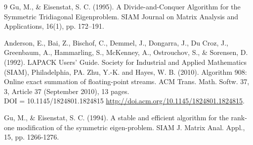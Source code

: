 \documentclass[11pt,a4paper]{article}
\begin{document}
\begin{thebibliography}{9}
    Gu, M., \& Eisenstat, S. C. (1995). \rm{A Divide-and-Conquer Algorithm for the Symmetric Tridiagonal Eigenproblem}. SIAM Journal on Matrix Analysis and Applications, 16(1), pp. 172--191.

    Anderson, E., Bai, Z., Bischof, C., Demmel, J., Dongarra, J., Du Croz, J., Greenbaum, A., Hammarling, S., McKenney, A., Ostrouchov, S., \& Sorensen, D. (1992). \rm{LAPACK Users' Guide}. Society for Industrial and Applied Mathematics (SIAM), Philadelphia, PA.
    Zhu, Y.-K. and Hayes, W. B. (2010). \rm{Algorithm 908: Online exact summation of ﬂoating-point streams}. ACM Trans. Math. Softw. 37, 3, Article 37 (September 2010), 13 pages.\\
    DOI = 10.1145/1824801.1824815 \href{https://dl.acm.org/doi/epdf/10.1145/1824801.1824815}{http://doi.acm.org/10.1145/1824801.1824815}.

    Gu, M., \& Eisenstat, S. C. (1994). \rm{A stable and efficient algorithm for the rank-one modification of the symmetric eigen-problem}. SIAM J. Matrix Anal. Appl., 15, pp. 1266-1276.
\end{thebibliography}
\end{document}
